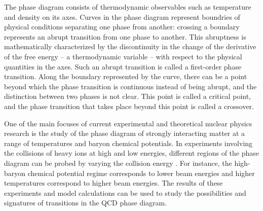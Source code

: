 The phase diagram consists of thermodynamic observables such as temperature and density on its axes. Curves in the phase diagram represent boundries of physical conditions separating one phase from another: crossing a boundary represents an abrupt transition from one phase to another. This abruptness is mathematically characterized by the discontinuity in the change of the derivative of the free energy -- a thermodynamic variable -- with respect to the physical quantities in the axes. Such an abrupt transition is called a first-order phase transition. Along the boundary represented by the curve, there can be a point beyond which the phase transition is continuous instead of being abrupt, and the distinction between two phases is not clear. This point is called a critical point, and the phase transition that takes place beyond this point is called a crossover.%

One of the main focuses of current experimental and theoretical nuclear physics research is the study of the phase diagram of strongly interacting matter at a range of temperatures and baryon chemical potentials. In experiments involving the collisions of heavy ions at high and low energies, different regions of the phase diagram can be probed by varying the collision energy \cite{PhysRevC.93.024901}. For instance, the high-baryon chemical potential regime corresponds to lower beam energies and higher temperatures correspond to higher beam energies. The results of these experiments and model calculations can be used to study the possibilities and signatures of transitions in the QCD phase diagram.

